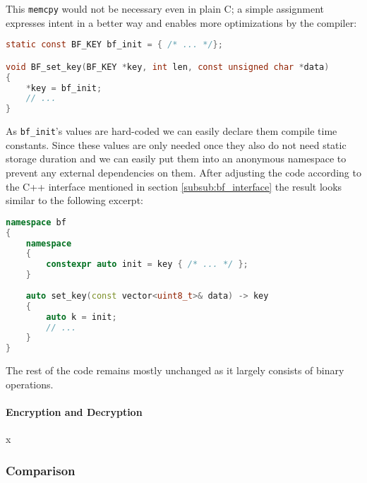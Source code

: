 This \texttt{memcpy} would not be necessary even in plain C; a simple assignment expresses intent in a better way and enables more optimizations by the compiler:

\begin{lstlisting}[language=C]
static const BF_KEY bf_init = { /* ... */};

void BF_set_key(BF_KEY *key, int len, const unsigned char *data)
{
    *key = bf_init;
    // ...
}
\end{lstlisting}

As \texttt{bf\_init}'s values are hard-coded we can easily declare them compile time constants. Since these values are only needed once they also do not need static storage duration and we can easily put them into an anonymous namespace to prevent any external dependencies on them. After adjusting the code according to the C++ interface mentioned in section \ref{subsub:bf_interface} the result looks similar to the following excerpt:

\begin{lstlisting}[language=C++]
namespace bf
{
    namespace
    {
        constexpr auto init = key { /* ... */ };
    }
    
    auto set_key(const vector<uint8_t>& data) -> key
    {
        auto k = init;
        // ...
    }
}
\end{lstlisting}

The rest of the code remains mostly unchanged as it largely consists of binary operations.

\paragraph{Encryption and Decryption}

x

\subsubsection{Comparison}